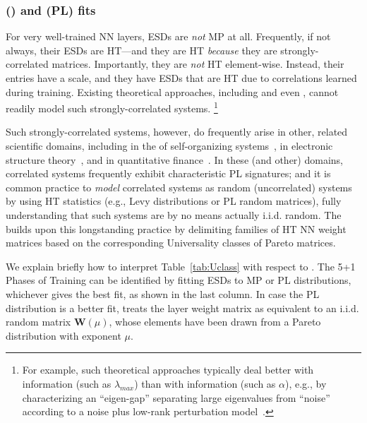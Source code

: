 \subsubsection{\HeavyTailed \RandomMatrixTheory (\HTRMT) and \PowerLaw (PL) fits}
\label{sxn:htsr_pl_fits}

For very well-trained NN layers, ESDs are \emph{not} MP at all.
Frequently, if not always, their ESDs are HT---and they are HT \emph{because} they are strongly-correlated matrices.  
Importantly, they are \emph{not} HT element-wise.
Instead, their entries have a scale, and they have ESDs that are HT due to correlations learned during training. 
Existing theoretical approaches, including \SLT and even \STATMECH, cannot readily model such strongly-correlated systems.%
\footnote{For example, such theoretical approaches typically deal better with \emph{\Scale} information (such as $\lambda_{max}$) than with 
\emph{\Shape} information (such as $\alpha$), e.g., by characterizing an ``eigen-gap'' separating large eigenvalues from 
``noise''~\cite{bach2006_JMLR} according to a noise plus low-rank perturbation model~\cite{BFR11}.}

Such strongly-correlated systems, however, do frequently arise in other, related scientific domains, including
in the \STATMECH of self-organizing systems~\cite{bak97a,SornetteBook}, 
in electronic structure theory~\cite{Martin1996,martin_reparametrizing_1998,martin1996redesigning}, and
in quantitative finance~\cite{bouchaud1999,bouchaud2005,potters_bouchaud_2020}. 
In these (and other) domains, correlated systems frequently exhibit characteristic PL signatures; and it is common practice to \emph{model} correlated systems as random (uncorrelated) systems by using HT statistics (e.g., Levy distributions or PL random matrices), fully understanding that such systems are by no means actually i.i.d. random.
The \HTSR \Phenomenology builds upon this longstanding practice by 
delimiting families of HT NN weight matrices based on the corresponding Universality classes of Pareto matrices. 

We explain briefly how to interpret Table~\ref{tab:Uclass} with respect to \HTRMT. The 5+1 Phases of Training can be 
identified by fitting ESDs to MP or PL distributions, whichever gives the best fit, as shown in the last column.
In case the PL distribution is a better fit, \HTSR \Phenomenology treats the layer weight matrix as 
equivalent to an i.i.d. random matrix $\mathbf{W}(\mu)$, whose elements have been drawn from a Pareto distribution 
with exponent $\mu$. 

